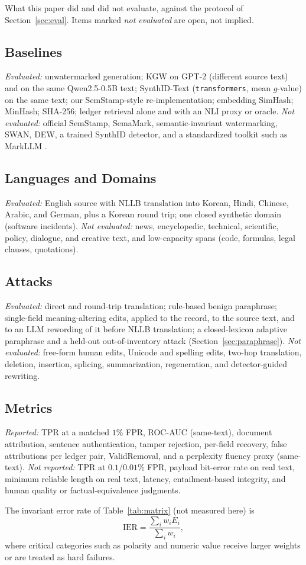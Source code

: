 \documentclass[journal]{IEEEtran}
\begin{document}
\label{app:protocol}
What this paper did and did not evaluate, against the protocol of
Section~\ref{sec:eval}. Items marked \emph{not evaluated} are open, not implied.

\subsection{Baselines}
\emph{Evaluated:} unwatermarked generation; KGW on GPT-2 (different source text) and on the same Qwen2.5-0.5B text; SynthID-Text (\texttt{transformers}, mean $g$-value) on the same text; our SemStamp-style re-implementation; embedding SimHash; MinHash; SHA-256; ledger retrieval alone and with an NLI proxy or oracle. \emph{Not evaluated:} official SemStamp, SemaMark, semantic-invariant watermarking, SWAN, DEW, a trained SynthID detector, and a standardized toolkit such as MarkLLM \cite{pan2024markllm}.

\subsection{Languages and Domains}
\emph{Evaluated:} English source with NLLB translation into Korean, Hindi, Chinese, Arabic, and German, plus a Korean round trip; one closed synthetic domain (software incidents). \emph{Not evaluated:} news, encyclopedic, technical, scientific, policy, dialogue, and creative text, and low-capacity spans (code, formulas, legal clauses, quotations).

\subsection{Attacks}
\emph{Evaluated:} direct and round-trip translation; rule-based benign paraphrase; single-field meaning-altering edits, applied to the record, to the source text, and to an LLM rewording of it before NLLB translation; a closed-lexicon adaptive paraphrase and a held-out out-of-inventory attack (Section~\ref{sec:paraphrase}). \emph{Not evaluated:} free-form human edits, Unicode and spelling edits, two-hop translation, deletion, insertion, splicing, summarization, regeneration, and detector-guided rewriting.

\subsection{Metrics}
\emph{Reported:} TPR at a matched $1\%$ FPR, ROC-AUC (same-text), document attribution, sentence authentication, tamper rejection, per-field recovery, false attributions per ledger pair, ValidRemoval, and a perplexity fluency proxy (same-text). \emph{Not reported:} TPR at $0.1$/$0.01\%$ FPR, payload bit-error rate on real text, minimum reliable length on real text, latency, entailment-based integrity, and human quality or factual-equivalence judgments.

The invariant error rate of Table~\ref{tab:matrix} (not measured here) is
\begin{equation}
\mathrm{IER}=\frac{\sum_i w_iE_i}{\sum_i w_i},
\end{equation}
where critical categories such as polarity and numeric value receive larger weights or are treated as hard failures.
\end{document}
